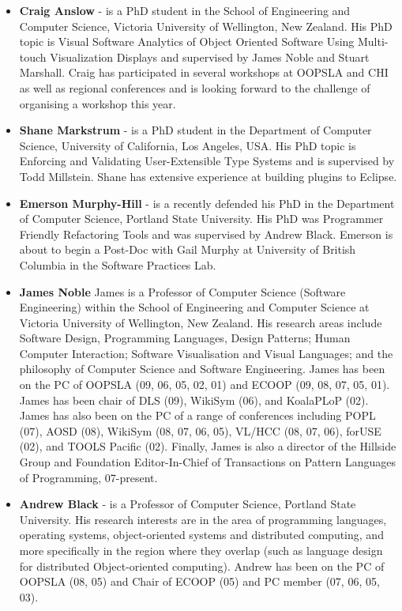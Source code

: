 \documentclass{acm_proc_article-sp}
\begin{document}
\begin{itemize}
\item \textbf{Craig Anslow} - is a PhD student in the School of Engineering and Computer Science, Victoria University of Wellington, New Zealand. His PhD topic is Visual Software Analytics of Object Oriented Software Using Multi-touch Visualization Displays and supervised by James Noble and Stuart Marshall. Craig has participated in several workshops at OOPSLA and CHI as well as regional conferences and is looking forward to the challenge of organising a workshop this year. 

\item \textbf{Shane Markstrum} - is a PhD student in the Department of Computer Science, University of California, Los Angeles, USA. His PhD topic is Enforcing and Validating User-Extensible Type Systems and is supervised by Todd Millstein. Shane has extensive experience at building plugins to Eclipse.

\item \textbf{Emerson Murphy-Hill} - is a recently defended his PhD in the Department of Computer Science, Portland State University. His PhD was Programmer Friendly Refactoring Tools and was supervised by Andrew Black. Emerson is about to begin a Post-Doc with Gail Murphy at University of British Columbia in the Software Practices Lab.

\item \textbf{James Noble} James is a Professor of Computer Science (Software Engineering) within the School of 
Engineering and Computer Science at Victoria University of Wellington, New Zealand. 
His research areas include Software Design, Programming Languages, Design Patterns; 
Human Computer Interaction; Software Visualisation and Visual Languages; and the philosophy of Computer Science and Software Engineering. James has been on the PC of OOPSLA (09, 06, 05, 02, 01) and ECOOP (09, 08, 07,  05, 01). James has been chair of DLS (09), WikiSym (06), and KoalaPLoP (02). James has also been on the PC of a range of conferences including POPL (07), AOSD (08), WikiSym (08, 07, 06, 05), VL/HCC (08, 07, 06), forUSE (02), and TOOLS Pacific (02). Finally, James is also a director of the Hillside Group and Foundation Editor-In-Chief of Transactions on Pattern Languages of Programming, 07-present.

\item \textbf{Andrew Black} - is a Professor of Computer Science, Portland State University. His research interests are in the area of programming languages, operating systems, object-oriented systems and distributed computing, and more specifically in the region where they overlap (such as language design for distributed Object-oriented computing). Andrew has been on the PC of OOPSLA (08, 05) and Chair of ECOOP (05) and PC member (07, 06, 05, 03).


\end{itemize}
\end{document}
